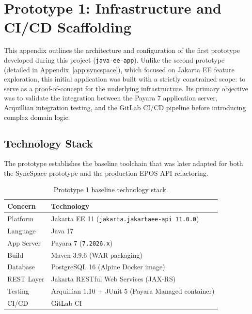 \chapter{Prototype 1: Infrastructure and CI/CD Scaffolding}
\label{app:proto1}

This appendix outlines the architecture and configuration of the first
prototype developed during this project (\texttt{java-ee-app}). Unlike the
second prototype (detailed in Appendix~\ref{app:syncspace}), which focused on
Jakarta EE feature exploration, this initial application was built with a
strictly constrained scope: to serve as a proof-of-concept for the underlying
infrastructure. Its primary objective was to validate the integration
between the Payara 7 application server, Arquillian integration testing,
and the GitLab \ac{CI}/\ac{CD} pipeline before introducing complex domain
logic.

\section{Technology Stack}
\label{app:proto1-stack}

The prototype establishes the baseline toolchain that was later adapted for both
the SyncSpace prototype and the production \ac{EPOS} \ac{API} refactoring.

\begin{table}[H]
	\centering
	\renewcommand{\arraystretch}{1.2}
	\begin{tabular}{ll}
		\toprule \textbf{Concern} & \textbf{Technology}                                   \\
		\midrule Platform         & Jakarta EE 11 (\texttt{jakarta.jakartaee-api 11.0.0}) \\
		Language                  & Java 17                                               \\
		App Server                & Payara 7 (\texttt{7.2026.x})                          \\
		Build                     & Maven 3.9.6 (\ac{WAR} packaging)                      \\
		Database                  & PostgreSQL 16 (Alpine Docker image)                   \\
		\ac{REST} Layer           & Jakarta \ac{REST}ful Web Services (\ac{JAX-RS})       \\
		Testing                   & Arquillian 1.10 + JUnit 5 (Payara Managed container)  \\
		\ac{CI}/\ac{CD}           & GitLab CI                                             \\
		\bottomrule
	\end{tabular}
	\caption{Prototype 1 baseline technology stack.}
\end{table}

